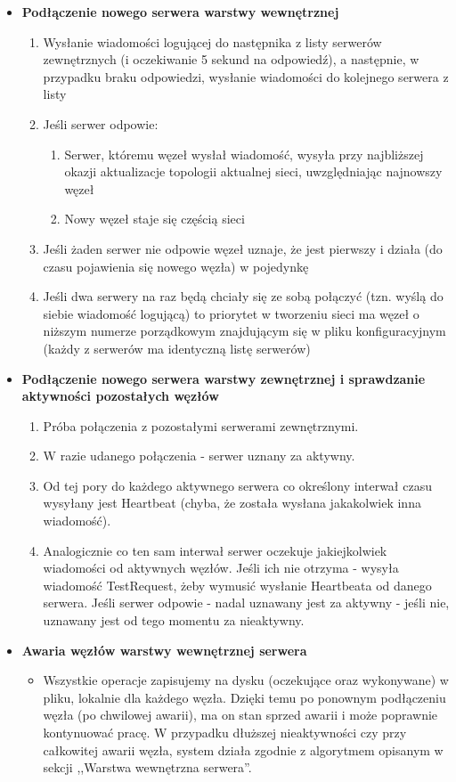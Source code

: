 {\begin{itemize}
\item \textbf{Podłączenie nowego serwera warstwy wewnętrznej}
\begin{enumerate}
\item Wysłanie wiadomości logującej do następnika z listy serwerów zewnętrznych (i oczekiwanie 5 sekund na odpowiedź), a następnie, w przypadku braku odpowiedzi, wysłanie wiadomości do kolejnego serwera z listy
\item Jeśli serwer odpowie:
\begin{enumerate}
\item Serwer, któremu węzeł wysłał wiadomość, wysyła przy najbliższej okazji aktualizacje topologii aktualnej sieci, uwzględniając najnowszy węzeł
\item Nowy węzeł staje się częścią sieci
\end{enumerate}
\item Jeśli żaden serwer nie odpowie węzeł uznaje, że jest pierwszy i działa (do czasu pojawienia się nowego węzła) w pojedynkę
\item Jeśli dwa serwery na raz będą chciały się ze sobą połączyć (tzn. wyślą do siebie wiadomość logującą) to priorytet w tworzeniu sieci ma węzeł o niższym numerze porządkowym znajdującym się w pliku konfiguracyjnym (każdy z serwerów ma identyczną listę serwerów)
\end{enumerate}
\item \textbf{Podłączenie nowego serwera warstwy zewnętrznej i sprawdzanie aktywności pozostałych węzłów}
\begin{enumerate}
\item Próba połączenia z pozostałymi serwerami zewnętrznymi.
\item W razie udanego połączenia - serwer uznany za aktywny.
\item Od tej pory do każdego aktywnego serwera co określony interwał czasu wysyłany jest Heartbeat (chyba, że została wysłana jakakolwiek inna wiadomość). 
\item Analogicznie co ten sam interwał serwer oczekuje jakiejkolwiek wiadomości od aktywnych węzłów. Jeśli ich nie otrzyma - wysyła wiadomość TestRequest, żeby wymusić wysłanie Heartbeata od danego serwera. Jeśli serwer odpowie - nadal uznawany jest za aktywny - jeśli nie, uznawany jest od tego momentu za nieaktywny.
\end{enumerate}

\item \textbf{Awaria węzłów warstwy wewnętrznej serwera}
\begin{itemize}
\item Wszystkie operacje zapisujemy na dysku (oczekujące oraz wykonywane) w pliku, lokalnie dla każdego węzła. Dzięki temu po ponownym podłączeniu węzła (po chwilowej awarii), ma on stan sprzed awarii i może poprawnie kontynuować pracę. W przypadku dłuższej nieaktywności czy przy całkowitej awarii węzła, system działa zgodnie z algorytmem opisanym w sekcji ,,Warstwa wewnętrzna serwera''.
\end{itemize}


\end{itemize}}
